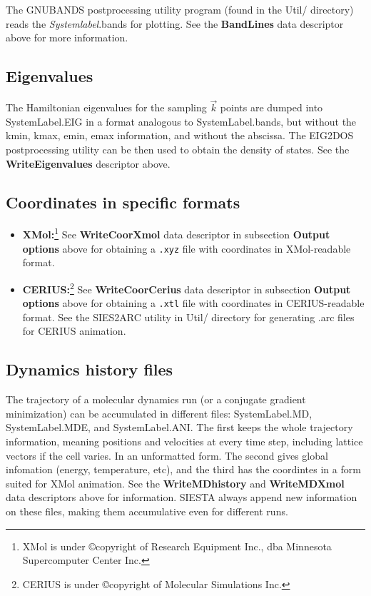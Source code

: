 \noindent
The GNUBANDS postprocessing utility
program (found in the Util/ directory) reads the {\it Systemlabel}.bands
for plotting.
See the {\bf BandLines} data descriptor above for more information.

\subsection{Eigenvalues}
The Hamiltonian eigenvalues for the sampling $\vec k$ points are
dumped into SystemLabel.EIG in a format analogous to SystemLabel.bands,
but without the kmin, kmax, emin, emax information, and without
the abscissa. The EIG2DOS
postprocessing utility can be then used to obtain the density of
states. 
See the {\bf WriteEigenvalues} descriptor above.


\subsection{Coordinates in specific formats}

\begin{itemize}
\item{\bf XMol:}\footnote[1]{XMol is under \copyright copyright of Research 
Equipment Inc., dba Minnesota Supercomputer Center Inc.}
See {\bf WriteCoorXmol} data descriptor in subsection {\bf Output options}
above for obtaining a {\tt .xyz} file with coordinates in 
XMol-readable format.

\item{\bf CERIUS:}\footnote[2]{CERIUS is under \copyright copyright of 
Molecular Simulations Inc.}
See {\bf WriteCoorCerius} data descriptor in subsection {\bf Output options}
above for obtaining a {\tt .xtl} file with coordinates in 
CERIUS-readable format. See the SIES2ARC
utility in Util/ directory
for generating .arc files for CERIUS animation.

\end{itemize}


\subsection{Dynamics history files}
The trajectory of a molecular dynamics run (or a conjugate gradient
minimization) can be accumulated in different files: SystemLabel.MD,
SystemLabel.MDE, and SystemLabel.ANI. The first keeps the whole trajectory
information, meaning positions and velocities at every time step, 
including lattice vectors if the cell varies. In an unformatted form.
The second gives global infomation (energy, temperature, etc),
and the third has the coordintes in a form suited for XMol animation.
See the {\bf WriteMDhistory} and {\bf WriteMDXmol} data descriptors 
above for information. SIESTA always append new information on these
files, making them accumulative even for different runs.

